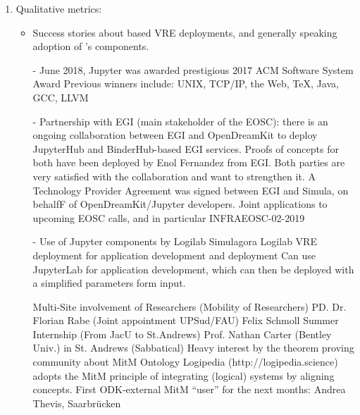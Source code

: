 \begin{enumerate}
\item Qualitative metrics:
\begin{itemize}
\item Success stories about \ODK based VRE deployments, and generally speaking adoption of \ODK's components.
\item[-] June 2018, Jupyter was awarded prestigious 2017 ACM Software System Award
Previous winners include: UNIX, TCP/IP, the Web, TeX, Java, GCC, LLVM

\item[-] Partnership with EGI (main stakeholder of the EOSC): there is an ongoing collaboration between EGI and OpenDreamKit to deploy
JupyterHub and BinderHub-based EGI services. Proofs of concepts for both have been deployed by Enol Fernandez from EGI. Both parties
are very satisfied with the collaboration and want to strengthen it. A Technology Provider Agreement was signed between EGI and
Simula, on behalfF of OpenDreamKit/Jupyter developers. Joint applications to upcoming EOSC calls, and in particular INFRAEOSC-02-2019
  
\item[-] Use of Jupyter components by Logilab
Simulagora
Logilab VRE deployment for application development and deployment
Can use JupyterLab for application development, which can then be deployed with a simplified parameters form input. %

Multi-Site involvement of Researchers (Mobility of Researchers)
PD. Dr. Florian Rabe (Joint appointment UPSud/FAU)
Felix Schmoll Summer Internship (From JacU to St.Andrews)
Prof. Nathan Carter (Bentley Univ.) in St. Andrews (Sabbatical)
Heavy interest by the theorem proving community about MitM Ontology
Logipedia (http://logipedia.science) adopts the MitM principle of integrating (logical) systems by aligning concepts.
First ODK-external MitM “user” for the next months: Andrea Thevis, Saarbrücken 


\end{itemize}
\end{enumerate}
